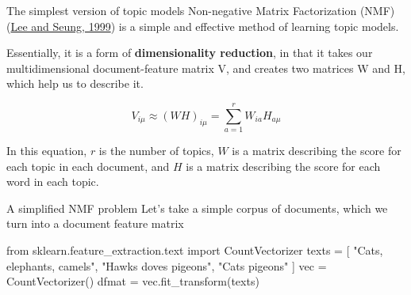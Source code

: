 \documentclass[
  10pt,
  ignorenonframetext,
  aspectratio=169]{beamer}
\newenvironment{Shaded}{\begin{snugshade}}{\end{snugshade}}
\newcommand{\ImportTok}[1]{\textcolor[rgb]{0.80,0.80,0.80}{#1}}
\newcommand{\NormalTok}[1]{\textcolor[rgb]{0.80,0.80,0.80}{#1}}
\newcommand{\OperatorTok}[1]{\textcolor[rgb]{0.94,0.94,0.82}{#1}}
\newcommand{\StringTok}[1]{\textcolor[rgb]{0.80,0.58,0.58}{#1}}
\begin{document}
\begin{frame}{The simplest version of topic models}
\protect\hypertarget{the-simplest-version-of-topic-models}{}
Non-negative Matrix Factorization (NMF)
(\href{https://www.nature.com/articles/44565}{Lee and Seung, 1999}) is a
simple and effective method of learning topic models.

Essentially, it is a form of \textbf{dimensionality reduction}, in that
it takes our multidimensional document-feature matrix V, and creates two
matrices W and H, which help us to describe it.

\[ V_{i\mu} \approx (WH)_{i\mu} =\sum_{a=1}^{r}W_{ia}H_{a\mu} \]

In this equation, \(r\) is the number of topics, \(W\) is a matrix
describing the score for each topic in each document, and \(H\) is a
matrix describing the score for each word in each topic.
\end{frame}

\begin{frame}[fragile]{A simplified NMF problem}
\protect\hypertarget{a-simplified-nmf-problem}{}
Let's take a simple corpus of documents, which we turn into a document
feature matrix

\medskip

\scriptsize

\begin{Shaded}
\begin{Highlighting}[]
\ImportTok{from}\NormalTok{ sklearn.feature\_extraction.text }\ImportTok{import}\NormalTok{ CountVectorizer}
\NormalTok{texts }\OperatorTok{=}\NormalTok{ [}
    \StringTok{"Cats, elephants, camels"}\NormalTok{,}
    \StringTok{"Hawks doves pigeons"}\NormalTok{,}
    \StringTok{"Cats pigeons"}
\NormalTok{]}
\NormalTok{vec }\OperatorTok{=}\NormalTok{ CountVectorizer()}
\NormalTok{dfmat }\OperatorTok{=}\NormalTok{ vec.fit\_transform(texts)}
\end{Highlighting}
\end{Shaded}
\end{frame}
\end{document}
